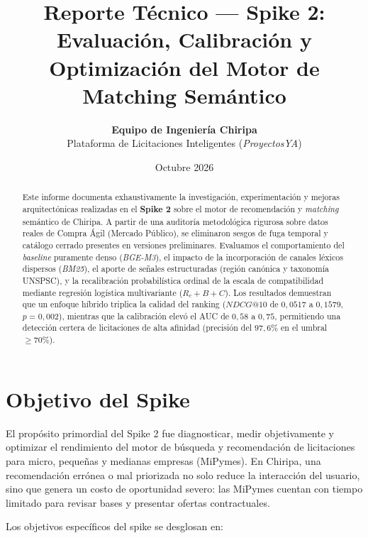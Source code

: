 \documentclass[11pt,a4paper]{article}
\title{\textbf{Reporte Técnico --- Spike 2:}\\[0.3em]
\Large Evaluación, Calibración y Optimización del Motor de Matching Semántico}
\author{\textbf{Equipo de Ingeniería Chiripa} \\
Plataforma de Licitaciones Inteligentes (\textit{ProyectosYA})}
\date{Octubre 2026}
\begin{document}
\maketitle

\begin{abstract}
Este informe documenta exhaustivamente la investigación, experimentación y mejoras arquitectónicas realizadas en el \textbf{Spike 2} sobre el motor de recomendación y \textit{matching} semántico de Chiripa. A partir de una auditoría metodológica rigurosa sobre datos reales de Compra Ágil (Mercado Público), se eliminaron sesgos de fuga temporal y catálogo cerrado presentes en versiones preliminares. Evaluamos el comportamiento del \textit{baseline} puramente denso (\textit{BGE-M3}), el impacto de la incorporación de canales léxicos dispersos (\textit{BM25}), el aporte de señales estructuradas (región canónica y taxonomía UNSPSC), y la recalibración probabilística ordinal de la escala de compatibilidad mediante regresión logística multivariante ($R_c + B + C$). Los resultados demuestran que un enfoque híbrido triplica la calidad del ranking ($NDCG@10$ de $0{,}0517$ a $0{,}1579$, $p=0{,}002$), mientras que la calibración elevó el AUC de $0{,}58$ a $0{,}75$, permitiendo una detección certera de licitaciones de alta afinidad (precisión del $97{,}6\%$ en el umbral $\ge 70\%$).
\end{abstract}

\tableofcontents
\newpage

\section{Objetivo del Spike}

El propósito primordial del Spike 2 fue diagnosticar, medir objetivamente y optimizar el rendimiento del motor de búsqueda y recomendación de licitaciones para micro, pequeñas y medianas empresas (MiPymes). En Chiripa, una recomendación errónea o mal priorizada no solo reduce la interacción del usuario, sino que genera un costo de oportunidad severo: las MiPymes cuentan con tiempo limitado para revisar bases y presentar ofertas contractuales.

Los objetivos específicos del spike se desglosan en:
\end{document}
